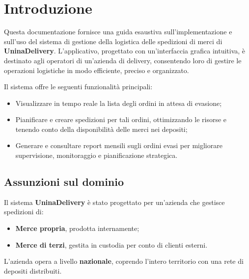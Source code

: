 \section{Introduzione}

Questa documentazione fornisce una guida esaustiva sull'implementazione e sull'uso del sistema di gestione della logistica delle spedizioni di merci di \textbf{UninaDelivery}. L'applicativo, progettato con un'interfaccia grafica intuitiva, è destinato agli operatori di un'azienda di delivery, consentendo loro di gestire le operazioni logistiche in modo efficiente, preciso e organizzato.

Il sistema offre le seguenti funzionalità principali:
\begin{itemize}[leftmargin=*,label={\textbullet},itemsep=0pt,topsep=0pt,partopsep=0pt]
  \item Visualizzare in tempo reale la lista degli ordini in attesa di evasione;
  \item Pianificare e creare spedizioni per tali ordini, ottimizzando le risorse e tenendo conto della disponibilità delle merci nei depositi;
  \item Generare e consultare report mensili sugli ordini evasi per migliorare supervisione, monitoraggio e pianificazione strategica.
\end{itemize}

\subsection{Assunzioni sul dominio}

Il sistema \textbf{UninaDelivery} è stato progettato per un'azienda che gestisce spedizioni di:
\begin{itemize}[leftmargin=*,label={\textbullet},itemsep=0pt,topsep=0pt,partopsep=0pt]
  \item \textbf{Merce propria}, prodotta internamente;
  \item \textbf{Merce di terzi}, gestita in custodia per conto di clienti esterni.
\end{itemize}
L'azienda opera a livello \textbf{nazionale}, coprendo l'intero territorio con una rete di depositi distribuiti.

